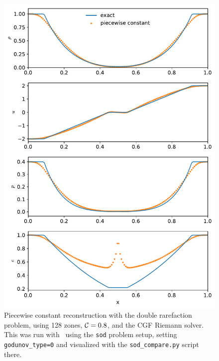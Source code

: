 \begin{figure}[t]
\centering
\includegraphics[width=0.7\linewidth]{hydro1d_god_double_rare}
\caption{\label{fig:Euler:doublerare:god} Piecewise constant
  reconstruction with the double rarefaction problem, using 128 zones,
  ${\mathcal{C}} = 0.8$, and the CGF Riemann solver.  This was run with
  \hydrooned\ using the {\tt sod} problem setup, setting {\tt
    godunov\_type=0} and visualized with the {\tt sod\_compare.py}
  script there.}
\end{figure}

